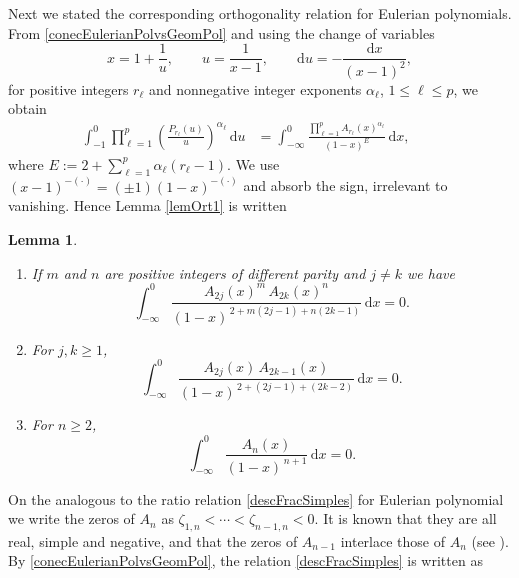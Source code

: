 \documentclass[11pt]{article}
\newtheorem{lemma}{Lemma}
\newcommand{\dd}{\mathrm{d}}
\begin{document}
Next we stated the corresponding orthogonality relation for Eulerian polynomials. From \eqref{conecEulerianPolvsGeomPol} and using the change of variables
\begin{equation}\label{eq:xu}
 x=1+\frac{1}{u},\quad\quad u=\frac{1}{x-1}, \qquad \dd u = -\frac{\dd x}{(x-1)^2},
\end{equation}
for positive integers $r_\ell$ and nonnegative integer exponents $\alpha_\ell$, $1\le \ell\le p$, we obtain
\begin{align}
 \int_{-1}^0 \prod_{\ell=1}^p \left(\frac{P_{r_\ell}(u)}{u}\right)^{\alpha_\ell}\,\dd u
 &= \int_{-\infty}^{0} \frac{\prod_{\ell=1}^p A_{r_\ell}(x)^{\alpha_\ell}}{(1-x)^{E}}\,\dd x,
 \qquad \label{eq:transfer}
\end{align}
where $E:=2+\sum_{\ell=1}^p \alpha_\ell(r_\ell-1).$ We use $(x-1)^{-(\cdot)}=(\pm1)(1-x)^{-(\cdot)}$ and absorb the sign, irrelevant to vanishing. Hence Lemma \ref{lemOrt1} is written
\begin{lemma}\label{lem:Euler-analogue}
\hfill
\begin{enumerate}
  \item If $m$ and $n$ are positive integers of different parity and $j\ne k$ we have 
  \begin{equation}\label{eq:analogue1}
  \int_{-\infty}^{0} \frac{A_{2j}(x)^m\,A_{2k}(x)^n}{(1-x)^{\,2+m(2j-1)+n(2k-1)}}\,\dd x=0.
  \end{equation}

  \item For $j,k\ge1$,
  \begin{equation}\label{eq:analogue2}
  \int_{-\infty}^{0} \frac{A_{2j}(x)\,A_{2k-1}(x)}{(1-x)^{\,2+(2j-1)+(2k-2)}}\,\dd x=0.
  \end{equation}

  \item For $n\ge2$,
  \begin{equation}\label{eq:analogue3}
  \int_{-\infty}^{0} \frac{A_n(x)}{(1-x)^{\,n+1}}\,\dd x=0.
  \end{equation}
\end{enumerate}
\end{lemma}
On the analogous to the ratio relation \eqref{descFracSimples} for Eulerian polynomial we write the zeros of $A_n$ as $\zeta_{1,n}<\cdots<\zeta_{n-1,n}<0$. It is known that they are all real, simple and negative, and that the zeros of $A_{n-1}$ interlace those of $A_n$ (see \cite{SavVis,YanZha}). By \eqref{conecEulerianPolvsGeomPol}, the relation \eqref{descFracSimples}
 is written as
\end{document}
